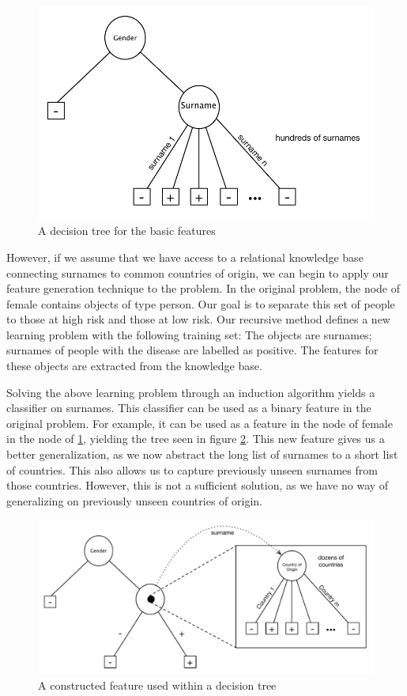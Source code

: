 \documentclass[twoside,11pt]{article}
\theoremstyle{definition}
\begin{document}
\begin{figure}
	\centering
	\includegraphics[width=\linewidth]{fig1.pdf}
	\caption{A decision tree for the basic features}
	\label{fig:tree_base}
\end{figure}

However, if we assume that we have access to a relational knowledge base connecting surnames to common countries of origin, we can begin to apply our feature generation technique to the problem. In the original problem, the node of female contains objects of type person. Our goal is to separate this set of people to those at high risk and those at low risk. Our recursive method defines a new learning problem with the following training set: The objects are surnames; surnames of people with the disease are labelled as positive. The features for these objects are extracted from the knowledge base.

Solving the above learning problem through an induction algorithm yields a classifier on surnames. This classifier can be used as a binary feature in the original problem. For example, it can be used as a feature in the node of female in the node of \ref{fig:tree_base}, yielding the tree seen in figure \ref{fig:lvl1_tree}. This new feature gives us a better generalization, as we now abstract the long list of surnames to a short list of countries. This also allows us to capture previously unseen surnames from those countries. However, this is not a sufficient solution, as we have no way of generalizing on previously unseen countries of origin.

\begin{figure}
	\centering
	\includegraphics[width=\linewidth]{fig2.pdf}
	\caption{A constructed feature used within a decision tree}
	\label{fig:lvl1_tree}
\end{figure}
\end{document}
